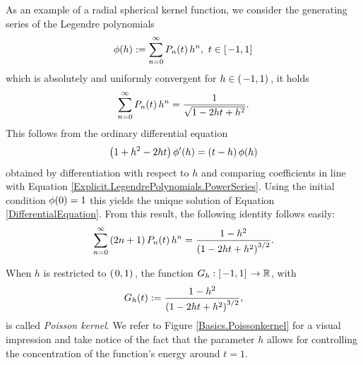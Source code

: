 As an example of a radial spherical kernel function, we consider the generating series of the Legendre polynomials
\begin{equation}
  \label{GeneratingFunction}
  \phi{\hspace{-0.4ex}}\left(h\right) := \sum_{n = 0}^{\infty} P_n{\hspace{-0.4ex}}\left(t\right) h^n,\ t \in
  \left[\left.-1,1\right]\right.
\end{equation}
which is absolutely and uniformly convergent for $h \in
\left(\left.-1,1\right)\right.$, it holds
\begin{equation}
  \label{Explicit}
    \sum_{n = 0}^{\infty} P_n{\hspace{-0.4ex}}\left(t\right) h^n = \frac{1}{\sqrt{1-2ht+h^2}}.
\end{equation}
This follows from the ordinary differential equation
\begin{equation}
\label{DifferentialEquation}
  \left(1+h^2-2ht\right)\phi'{\hspace{-0.4ex}}\left(h\right) = \left(t-h\right)\phi{\hspace{-0.4ex}}\left(h\right)
\end{equation}
obtained by differentiation with respect to $h$ and comparing coefficients in line with Equation
\eqref{Explicit.LegendrePolynomials.PowerSeries}. Using the initial 
condition $\phi{\hspace{-0.4ex}}\left(0\right)=1$ this yields the unique solution of Equation
\eqref{DifferentialEquation}.
From this result, the following identity follows easily:
\begin{equation}
  \nonumber
  \sum_{n=0}^{\infty} \left(2n+1\right) P_n{\hspace{-0.4ex}}\left(t\right) h^n =
  \frac{1-h^2}{\left(1-2ht+h^2\right)^{3/2}}.
\end{equation}

When $h$ is restricted to $\left(\left.0,1\right)\right.$, the function
$G_h:\left[\left.-1,1\right]\right. \rightarrow \mathbb{R}$, with
\begin{equation}
  \label{PoissonKernel}
  \nonumber
  G_h{\hspace{-0.4ex}}\left(t\right) := \frac{1-h^2}{\left(1-2ht+h^2\right)^{3/2}},
\end{equation}
is called \emph{Poisson kernel}. We refer 
to Figure \ref{Basics.Poissonkernel}
for a visual impression and take notice of the fact that the parameter $h$
allows for controlling the concentration of the function's energy around
$t = 1$.

